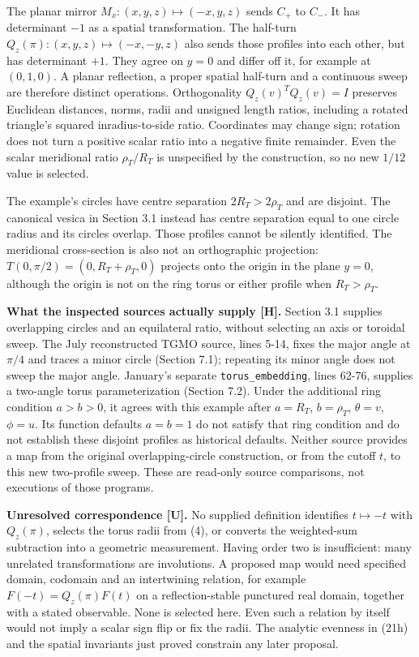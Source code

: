 \documentclass[11pt,a4paper]{article}
\begin{document}
The planar mirror $M_x:(x,y,z)\mapsto(-x,y,z)$ sends $C_+$ to $C_-$. It has determinant $-1$ as a spatial transformation. The half-turn $Q_z(\pi):(x,y,z)\mapsto(-x,-y,z)$ also sends those profiles into each other, but has determinant $+1$. They agree on $y=0$ and differ off it, for example at $(0,1,0)$. A planar reflection, a proper spatial half-turn and a continuous sweep are therefore distinct operations. Orthogonality $Q_z(v)^TQ_z(v)=I$ preserves Euclidean distances, norms, radii and unsigned length ratios, including a rotated triangle's squared inradius-to-side ratio. Coordinates may change sign; rotation does not turn a positive scalar ratio into a negative finite remainder. Even the scalar meridional ratio $\rho_T/R_T$ is unspecified by the construction, so no new $1/12$ value is selected.

The example's circles have centre separation $2R_T>2\rho_T$ and are disjoint. The canonical vesica in Section 3.1 instead has centre separation equal to one circle radius and its circles overlap. Those profiles cannot be silently identified. The meridional cross-section is also not an orthographic projection: $T(0,\pi/2)=(0,R_T+\rho_T,0)$ projects onto the origin in the plane $y=0$, although the origin is not on the ring torus or either profile when $R_T>\rho_T$.

\textbf{What the inspected sources actually supply [H].} Section 3.1 supplies overlapping circles and an equilateral ratio, without selecting an axis or toroidal sweep. The July reconstructed TGMO source, lines 5-14, fixes the major angle at $\pi/4$ and traces a minor circle (Section 7.1); repeating its minor angle does not sweep the major angle. January's separate \texttt{torus\_embedding}, lines 62-76, supplies a two-angle torus parameterization (Section 7.2). Under the additional ring condition $a>b>0$, it agrees with this example after $a=R_T$, $b=\rho_T$, $\theta=v$, $\phi=u$. Its function defaults $a=b=1$ do not satisfy that ring condition and do not establish these disjoint profiles as historical defaults. Neither source provides a map from the original overlapping-circle construction, or from the cutoff $t$, to this new two-profile sweep. These are read-only source comparisons, not executions of those programs.

\textbf{Unresolved correspondence [U].} No supplied definition identifies $t\mapsto-t$ with $Q_z(\pi)$, selects the torus radii from (4), or converts the weighted-sum subtraction into a geometric measurement. Having order two is insufficient: many unrelated transformations are involutions. A proposed map would need specified domain, codomain and an intertwining relation, for example $F(-t)=Q_z(\pi)F(t)$ on a reflection-stable punctured real domain, together with a stated observable. None is selected here. Even such a relation by itself would not imply a scalar sign flip or fix the radii. The analytic evenness in (21h) and the spatial invariants just proved constrain any later proposal.
\end{document}
